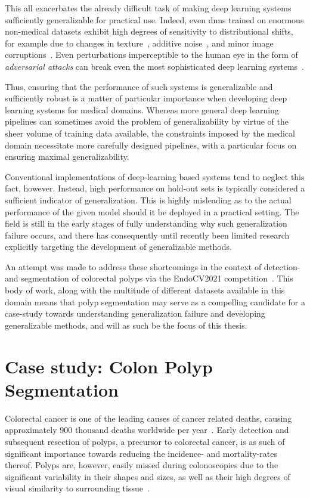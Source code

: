     This all exacerbates the already difficult task of making deep learning systems sufficiently generalizable for practical use. Indeed, even \glspl{dnn} trained on enormous non-medical datasets exhibit high degrees of sensitivity to distributional shifts, for example due to changes in texture~\cite{texturebias}, additive noise~\cite{noise_robustness}, and minor image corruptions~\cite{corruption_robustness}. Even perturbations imperceptible to the human eye in the form of \textit{adversarial attacks} can break even the most sophisticated deep learning systems~\cite{adversarial_attacks}.
    
    Thus, ensuring that the performance of such systems is generalizable and sufficiently robust is a matter of particular importance when developing deep learning systems for medical domains. Whereas more general deep learning pipelines can sometimes avoid the problem of generalizability by virtue of the sheer volume of training data available, the constraints imposed by the medical domain necessitate more carefully designed pipelines, with a particular focus on ensuring maximal generalizability. 
    
    Conventional implementations of deep-learning based systems tend to neglect this fact, however. Instead, high performance on hold-out sets is typically considered a sufficient indicator of generalization. This is highly misleading as to the actual performance of the given model should it be deployed in a practical setting. The field is still in the early stages of fully understanding why such generalization failure occurs, and there has consequently until recently been limited research explicitly targeting the development of generalizable methods. 
    
    An attempt was made to address these shortcomings in the context of detection- and segmentation of colorectal polyps via the EndoCV2021 competition~\cite{endocv2021}. This body of work, along with the multitude of different datasets available in this domain means that polyp segmentation may serve as a compelling candidate for a case-study towards understanding generalization failure and developing generalizable methods, and will as such be the focus of this thesis.   
    
    \section{Case study: Colon Polyp Segmentation}   
    Colorectal cancer is one of the leading causes of cancer related deaths, causing approximately 900 thousand deaths worldwide per year~\cite{colorectal_cancer}. Early detection and subsequent resection of polyps, a precursor to colorectal cancer, is as such of significant importance towards reducing the incidence- and mortality-rates thereof. Polyps are, however, easily missed during colonoscopies due to the significant variability in their shapes and sizes, as well as their high degrees of visual similarity to surrounding tissue~\cite{missrate1, missrate2}. 
    
